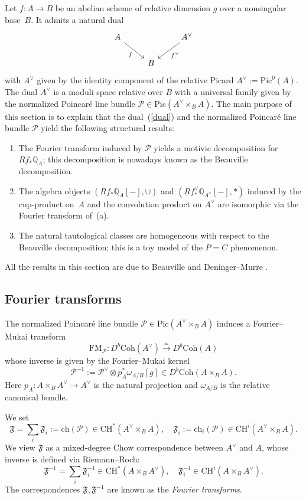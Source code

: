 \documentclass[11pt]{amsart}
\theoremstyle{plain}
\theoremstyle{definition}
\theoremstyle{remark}
\newcommand{\BQ}{{\mathbb{Q}}}
\newcommand{\CP}{{\mathcal P}}
\newcommand{\ch}{{\mathrm{ch}}}
\begin{document}
Let $f: A \to B$ be an abelian scheme of relative dimension $g$ over a nonsingular base~$B$. It admits a natural dual 
\begin{equation}\label{dual}
\begin{tikzcd}
A \arrow[dr, "f"'] & & A^\vee \arrow[dl, "f^\vee"] \\
& B
\end{tikzcd}
\end{equation}
with $A^\vee$ given by the identity component of the relative Picard $A^\vee:= \mathrm{Pic}^0(A)$. The dual $A^\vee$ is a moduli space relative over $B$ with a universal family given by the normalized Poincar\'e line bundle $\CP \in \mathrm{Pic}(A^\vee \times_B A)$. The main purpose of this section is to explain that the dual~(\ref{dual}) and the normalized Poincar\'e line bundle $\CP$ yield the following structural results:
\begin{enumerate}
    \item[(a)] The Fourier transform induced by $\CP$ yields a motivic decomposition for $Rf_*\BQ_A$; this decomposition is nowadays known as the Beauville decomposition.
    \item[(b)] The algebra objects $(Rf_*\BQ_A[-], \cup)$ and $(Rf^\vee_* \BQ_{A^\vee}[-], \ast)$ induced by the cup-product on~$A$ and the convolution product on $A^\vee$ are isomorphic via the Fourier transform of~(a).
    \item[(c)] The natural tautological classes are homogeneous with respect to the Beauville decomposition; this is a toy model of the $P=C$ phenomenon.
\end{enumerate}
All the results in this section are due to Beauville \cite{B} and Deninger--Murre \cite{DM}.

\subsection{Fourier transforms}\label{sec1.2}
The normalized Poincar\'e line bundle $\CP \in \mathrm{Pic}(A^\vee \times_B A)$ induces a Fourier--Mukai transform
\[
\mathrm{FM}_\CP: D^b\mathrm{Coh}(A^\vee) \xrightarrow{\simeq} D^b\mathrm{Coh}(A)
\]
whose inverse is given by the Fourier--Mukai kernel
\[
\CP^{-1}:= \CP^\vee \otimes p_A^*\omega_{A/B}[g] \in D^b\mathrm{Coh}(A \times_B A).
\]
Here $p_A: A\times_B A^\vee \to A^\vee$ is the natural projection and $\omega_{A/B}$ is the relative canonical bundle. 

We set
\begin{equation*} 
\mathfrak{F} = \sum_i \mathfrak{F}_i := \ch(\CP) \in \mathrm{CH}^*(A^\vee \times_B A), \quad \mathfrak{F}_i := \ch_i(\CP) \in \mathrm{CH}^i(A^\vee \times_B A).
\end{equation*}
We view $\mathfrak{F}$ as a mixed-degree Chow correspondence between $A^\vee$ and $A$, whose inverse is defined via Riemann--Roch:
\[
\mathfrak{F}^{-1} = \sum_i \mathfrak{F}^{-1}_i\in \mathrm{CH}^*(A \times_B A^\vee), \quad \mathfrak{F}^{-1}_i \in \mathrm{CH}^i(A \times_B A^\vee).
\]
The correspondences $\mathfrak{F}, \mathfrak{F}^{-1}$ are known as the \emph{Fourier transforms}.
\end{document}
